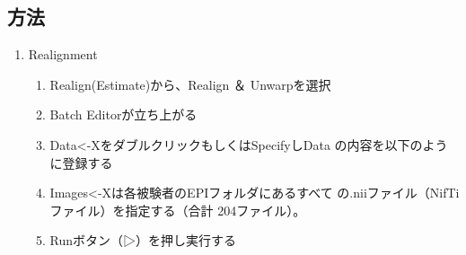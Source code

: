 \documentclass{jlreq}
\begin{document}
\subsection{方法}
\begin{enumerate}
    \item Realignment
    \begin{enumerate}
        \item Realign(Estimate)から、Realign ＆ Unwarpを選択
        \item Batch Editorが立ち上がる
        \item Data<-XをダブルクリックもしくはSpecifyしData
の内容を以下のように登録する 
        \item Images<-Xは各被験者のEPIフォルダにあるすべて
の.niiファイル（NifTiファイル）を指定する（合計
204ファイル）。
        \item Runボタン（▷）を押し実行する 
    \end{enumerate}


\end{enumerate}
\end{document}
